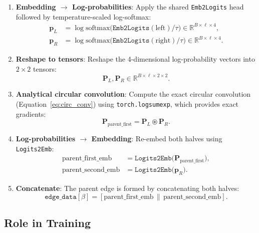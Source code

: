\documentclass[11pt,a4paper]{article}
\newcommand{\R}{\mathbb{R}}
\newcommand{\circonv}{\circledast}
\begin{document}
\begin{enumerate}
    \item \textbf{Embedding $\to$ Log-probabilities}: Apply the shared \texttt{Emb2Logits} head followed by temperature-scaled log-softmax:
    \begin{align}
        \bm{p}_L &= \log\text{softmax}\bigl(\texttt{Emb2Logits}(\text{left}) / \tau\bigr) \in \R^{B \times \ell \times 4}, \\
        \bm{p}_R &= \log\text{softmax}\bigl(\texttt{Emb2Logits}(\text{right}) / \tau\bigr) \in \R^{B \times \ell \times 4}.
    \end{align}

    \item \textbf{Reshape to tensors}: Reshape the 4-dimensional log-probability vectors into $2 \times 2$ tensors:
    \begin{equation}
        \bm{P}_L, \bm{P}_R \in \R^{B \times \ell \times 2 \times 2}.
    \end{equation}

    \item \textbf{Analytical circular convolution}: Compute the exact circular convolution (Equation~\eqref{eq:circ_conv}) using \texttt{torch.logsumexp}, which provides exact gradients:
    \begin{equation}
        \bm{P}_{\text{parent\_first}} = \bm{P}_L \circonv \bm{P}_R.
    \end{equation}

    \item \textbf{Log-probabilities $\to$ Embedding}: Re-embed both halves using \texttt{Logits2Emb}:
    \begin{align}
        \text{parent\_first\_emb} &= \texttt{Logits2Emb}\bigl(\bm{P}_{\text{parent\_first}}\bigr), \\
        \text{parent\_second\_emb} &= \texttt{Logits2Emb}\bigl(\bm{p}_R\bigr).
    \end{align}

    \item \textbf{Concatenate}: The parent edge is formed by concatenating both halves:
    \begin{equation}
        \texttt{edge\_data}[\beta] = [\text{parent\_first\_emb} \,\|\, \text{parent\_second\_emb}].
    \end{equation}
\end{enumerate}

\subsection{Role in Training}
\end{document}
